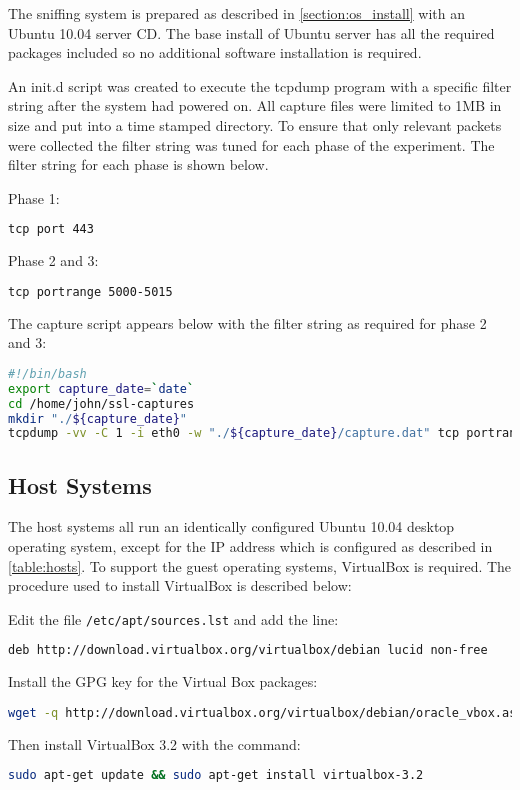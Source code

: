 The sniffing system is prepared as described in \ref{section:os_install} with an
Ubuntu 10.04 server CD. The base install of Ubuntu server has all the required
packages included so no additional software installation is required.

An init.d script was created to execute the tcpdump program with a specific
filter string after the system had powered on. All capture files were limited to
1MB in size and put into a time stamped directory. To ensure that only relevant
packets were collected the filter string was tuned for each phase of the
experiment. The filter string for each phase is shown below.

Phase 1:
\begin{lstlisting}[language=sh]
tcp port 443
\end{lstlisting}

Phase 2 and 3:
\begin{lstlisting}[language=sh]
tcp portrange 5000-5015
\end{lstlisting}

The capture script appears below with the filter string as required for phase 2
and 3:

\begin{lstlisting}[language=sh]
#!/bin/bash
export capture_date=`date`
cd /home/john/ssl-captures
mkdir "./${capture_date}"
tcpdump -vv -C 1 -i eth0 -w "./${capture_date}/capture.dat" tcp portrange 5001-5015
\end{lstlisting}

\subsection{Host Systems}

The host systems all run an identically configured Ubuntu 10.04 desktop
operating system, except for the IP address which is configured as described in
\ref{table:hosts}. To support the guest operating systems, VirtualBox is
required. The procedure used to install VirtualBox is described below:

\begin{enumerate*}
  \item Edit the file \verb+/etc/apt/sources.lst+ and add the line:
\begin{lstlisting}[language=sh]
deb http://download.virtualbox.org/virtualbox/debian lucid non-free
\end{lstlisting}
  \item Install the GPG key for the Virtual Box packages:
\begin{lstlisting}[language=sh]
wget -q http://download.virtualbox.org/virtualbox/debian/oracle_vbox.asc -O- | sudo apt-key add -
\end{lstlisting}
  \item Then install VirtualBox 3.2 with the command:
\begin{lstlisting}[language=sh]
sudo apt-get update && sudo apt-get install virtualbox-3.2
\end{lstlisting}
\end{enumerate*}

